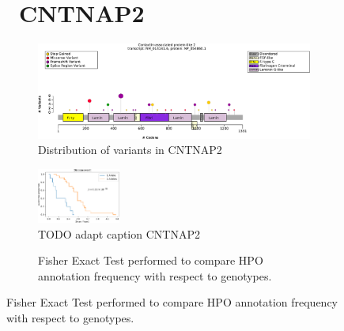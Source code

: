 \begin{figure}[htbp]
\section*{ CNTNAP2}
\centering
\begin{subfigure}[b]{0.95\textwidth}
\centering
\includegraphics[width=\textwidth]{ img/CNTNAP2_protein_diagram.pdf} 
\captionsetup{justification=raggedright,singlelinecheck=false}
\caption{Distribution of variants in CNTNAP2}
\end{subfigure}

\vspace{2em}

\begin{subfigure}[b]{0.95\textwidth}
\centering
\includegraphics[width=0.3\textwidth]{ img/CNTNAP2_stats.pdf} 
\captionsetup{justification=raggedright,singlelinecheck=false}
\caption{TODO adapt caption CNTNAP2}
\end{subfigure}

\vspace{2em}

\begin{subfigure}[b]{0.95\textwidth}
\centering
{}
\captionsetup{justification=raggedright,singlelinecheck=false}
\caption{Fisher Exact Test performed to compare HPO annotation frequency with respect to genotypes.}
\end{subfigure}


\end{figure}
